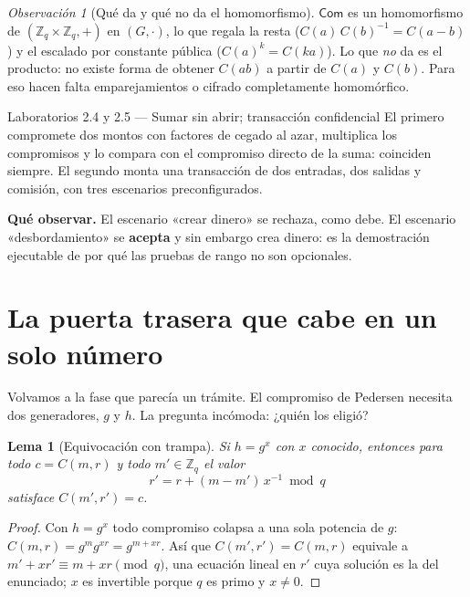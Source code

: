 \documentclass[11pt,a4paper]{article}
\theoremstyle{definition}
\theoremstyle{plain}
\newtheorem{lema}{Lema}
\theoremstyle{remark}
\newtheorem*{observacion}{Observación}
\newcommand{\Com}{\mathsf{Com}}
\newcommand{\Zq}{\mathbb{Z}_q}
\begin{document}
\begin{observacion}[Qué da y qué no da el homomorfismo]
$\Com$ es un homomorfismo de $(\Zq\times\Zq, +)$ en $(G, \cdot)$, lo que regala
la resta ($C(a)\,C(b)^{-1} = C(a-b)$) y el escalado por constante pública
($C(a)^{k} = C(ka)$). Lo que \emph{no} da es el producto: no existe forma de
obtener $C(ab)$ a partir de $C(a)$ y $C(b)$. Para eso hacen falta
emparejamientos o cifrado completamente homomórfico.
\end{observacion}

\begin{laboratorio}{Laboratorios 2.4 y 2.5 — Sumar sin abrir; transacción confidencial}
El primero compromete dos montos con factores de cegado al azar, multiplica los
compromisos y lo compara con el compromiso directo de la suma: coinciden siempre.
El segundo monta una transacción de dos entradas, dos salidas y comisión, con
tres escenarios preconfigurados.

\textbf{Qué observar.} El escenario «crear dinero» se rechaza, como debe. El
escenario «desbordamiento» se \textbf{acepta} y sin embargo crea dinero: es la
demostración ejecutable de por qué las pruebas de rango no son opcionales.
\end{laboratorio}

\section{La puerta trasera que cabe en un solo número}

Volvamos a la fase que parecía un trámite. El compromiso de Pedersen necesita dos
generadores, $g$ y $h$. La pregunta incómoda: ¿quién los eligió?

\begin{lema}[Equivocación con trampa]\label{lema:trapdoor}
Si $h = g^{x}$ con $x$ conocido, entonces para todo $c = C(m,r)$ y todo
$m' \in \Zq$ el valor
\[
  r' = r + (m - m')\,x^{-1} \bmod q
\]
satisface $C(m', r') = c$.
\end{lema}

\begin{proof}
Con $h = g^{x}$ todo compromiso colapsa a una sola potencia de $g$:
$C(m,r) = g^{m}g^{xr} = g^{m+xr}$. Así que $C(m',r') = C(m,r)$ equivale a
$m' + xr' \equiv m + xr \pmod q$, una ecuación lineal en $r'$ cuya solución es
la del enunciado; $x$ es invertible porque $q$ es primo y $x \neq 0$.
\end{proof}
\end{document}
